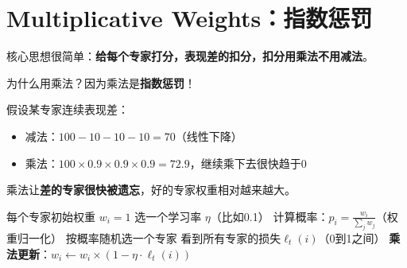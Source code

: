 \documentclass[11pt,a4paper]{article}
\theoremstyle{definition}
\begin{document}
\section{Multiplicative Weights：指数惩罚}

\begin{plainwords}
核心思想很简单：\textbf{给每个专家打分，表现差的扣分，扣分用乘法不用减法}。

为什么用乘法？因为乘法是\textbf{指数惩罚}！

假设某专家连续表现差：
\begin{itemize}
    \item 减法：$100 - 10 - 10 - 10 = 70$（线性下降）
    \item 乘法：$100 \times 0.9 \times 0.9 \times 0.9 = 72.9$，继续乘下去很快趋于0
\end{itemize}

乘法让\textbf{差的专家很快被遗忘}，好的专家权重相对越来越大。
\end{plainwords}

\begin{algorithm}[H]
\caption{Multiplicative Weights Update (MWU)}
\begin{algorithmic}[1]
\State 每个专家初始权重 $w_i = 1$
\State 选一个学习率 $\eta$（比如0.1）
    \State 计算概率：$p_i = \frac{w_i}{\sum_j w_j}$（权重归一化）
    \State 按概率随机选一个专家
    \State 看到所有专家的损失$\ell_t(i)$（0到1之间）
    \State \textbf{乘法更新}：$w_i \leftarrow w_i \times (1 - \eta \cdot \ell_t(i))$
\EndFor
\end{algorithmic}
\end{algorithm}
\end{document}
